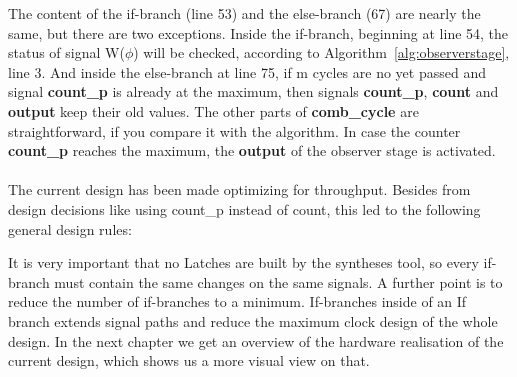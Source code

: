 The content of the if-branch (line 53) and the else-branch (67) are nearly the same, but there are two exceptions. 
Inside the if-branch, beginning at line 54, the status of signal W($\phi$) will be checked, according to Algorithm~\ref{alg:observerstage}, line 3. 
And inside the else-branch at line 75, if m cycles are no yet passed and signal \textbf{count\_p} is already  at the maximum, 
then signals \textbf{count\_p}, \textbf{count} and \textbf{output} keep their old values. 
The other parts of \textbf{comb\_cycle} are straightforward, if you compare it with the algorithm. In case the counter \textbf{count\_p} reaches the maximum, 
the  \textbf{output} of the observer stage is activated. \\\\
The current design has been made optimizing for throughput. Besides from design decisions like using count\_p instead of count, this led to the following general design rules:
 
It is very important that no Latches are built by the syntheses tool, so every if-branch must contain the same changes on the same signals. 
A further point is to reduce the number of if-branches to a minimum. If-branches inside of an If branch extends signal paths and reduce the maximum clock design of the whole design. 
In the next chapter we get an overview of the hardware realisation of the current design, which shows us a more visual view on that. 

